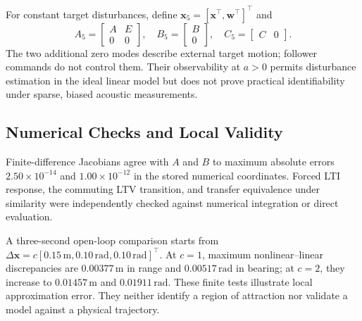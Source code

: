 For constant target disturbances, define $\mathbf x_5=[\mathbf x^\top,\mathbf w^\top]^\top$ and
\begin{equation}
A_5=\begin{bmatrix}A&E\\0&0\end{bmatrix},\quad
B_5=\begin{bmatrix}B\\0\end{bmatrix},\quad C_5=\begin{bmatrix}C&0\end{bmatrix}.
\end{equation}
The two additional zero modes describe external target motion; follower commands do not control them. Their observability at $a>0$ permits disturbance estimation in the ideal linear model but does not prove practical identifiability under sparse, biased acoustic measurements.

\subsection{Numerical Checks and Local Validity}
Finite-difference Jacobians agree with $A$ and $B$ to maximum absolute errors $2.50\times10^{-14}$ and $1.00\times10^{-12}$ in the stored numerical coordinates. Forced LTI response, the commuting LTV transition, and transfer equivalence under similarity were independently checked against numerical integration or direct evaluation.

A three-second open-loop comparison starts from $\Delta\mathbf x=c[0.15\,\mathrm m,0.10\,\mathrm{rad},0.10\,\mathrm{rad}]^\top$. At $c=1$, maximum nonlinear--linear discrepancies are $0.00377\,\mathrm m$ in range and $0.00517\,\mathrm{rad}$ in bearing; at $c=2$, they increase to $0.01457\,\mathrm m$ and $0.01911\,\mathrm{rad}$. These finite tests illustrate local approximation error. They neither identify a region of attraction nor validate a model against a physical trajectory.
